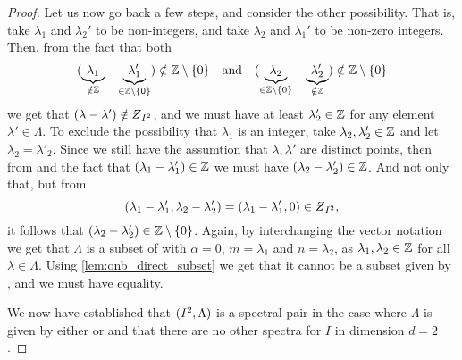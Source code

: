 \documentclass[../thesis.tex]{subfiles}
\begin{document}
\begin{proof}
    Let us now go back a few steps, and consider the other possibility. That is, take $\lambda_1$ and $\lambda_2'$ to be non-integers, and take $\lambda_2$ and $\lambda_1'$ to be non-zero integers. Then, from the fact that both 
    \begin{align*}
        (\underbrace{\lambda_1}_{\notin \mathbb{Z}}-\underbrace{\lambda_1'}_{\in \mathbb{Z}\setminus\{0\}}) \notin \mathbb{Z}\setminus\{0\}
        \quad \text{and} \quad
        (\underbrace{\lambda_2}_{\in \mathbb{Z}\setminus\{0\}}-\underbrace{\lambda_2'}_{\notin \mathbb{Z}}) \notin \mathbb{Z}\setminus\{0\}
    \end{align*}
    we get that $\brac{\lambda-\lambda'} \notin \Zstroke_{I^2}$, and we must have at least $\lambda_2'\in \mathbb{Z}$ for any element $\lambda'\in \Lambda$. To exclude the possibility that $\lambda_1$ is an integer, take $\lambda_2,\lambda'_2 \in \mathbb{Z}$ and let $\lambda_2 = \lambda'_2$. Since we still have the assumtion that $\lambda, \lambda'$ are distinct points, then from  and the fact that $(\lambda_1-\lambda'_1)\in \mathbb{Z}$ we must have $(\lambda_2-\lambda_2') \in \mathbb{Z}$. And not only that, but from
    \begin{equation*}
        \brac{\lambda_1-\lambda'_1,\lambda_2-\lambda'_2} = \brac{\lambda_1-\lambda'_1,0}\in \Zstroke_{I^2},
    \end{equation*}
    it follows that $(\lambda_2- \lambda_2') \in \mathbb{Z}\setminus\{0\}$. Again, by interchanging the vector notation we get that $\Lambda$ is a subset of  with $\alpha = 0$, $m = \lambda_1$ and $n = \lambda_2$, as $\lambda_1, \lambda_2 \in \mathbb{Z}$ for all $\lambda \in \Lambda$. Using \cref{lem:onb_direct_subset} we get that it cannot be a subset given by , and we must have equality.

    We now have established that $(I^2, \Lambda)$ is a spectral pair in the case where $\Lambda$ is given by either  or  and that there are no other spectra for $I$ in dimension $d=2$. 



\end{proof}
\end{document}

